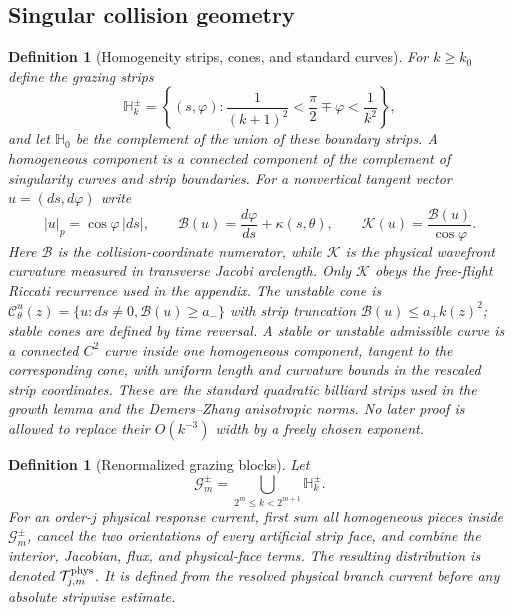 \documentclass[11pt]{amsart}
\theoremstyle{compactplain}
\theoremstyle{compactdefinition}
\newtheorem{definition}[theorem]{Definition}
\theoremstyle{compactremark}
\newcommand{\Hstrip}{\mathbb H}
\begin{document}
\subsection{Singular collision geometry}

\begin{definition}[Homogeneity strips, cones, and standard curves]
\label{def:strips_cones_standard_curves}
For $k\ge k_0$ define the grazing strips
\begin{equation}
  \Hstrip_k^\pm
  =\left\{(s,\varphi):
  \frac{1}{(k+1)^2}<
  \frac{\pi}{2}\mp\varphi<\frac{1}{k^2}\right\},
\end{equation}
and let $\Hstrip_0$ be the complement of the union of these boundary strips.
A homogeneous component is a connected component of the complement of
singularity curves and strip boundaries.  For a nonvertical tangent vector
$u=(ds,d\varphi)$ write
\begin{equation}
  |u|_p=\cos\varphi\,|ds|,
  \qquad
  \mathcal B(u)=\frac{d\varphi}{ds}+\kappa(s,\theta),
  \qquad
  \mathcal K(u)=\frac{\mathcal B(u)}{\cos\varphi}.
\end{equation}
Here \(\mathcal B\) is the collision-coordinate numerator, while
\(\mathcal K\) is the physical wavefront curvature measured in transverse
Jacobi arclength.  Only \(\mathcal K\) obeys the free-flight Riccati recurrence
used in the appendix.
The unstable cone is $\mathcal C^u_\theta(z)=\{u:ds\ne0,\mathcal B(u)\ge a_-\}$
with strip truncation
\(\mathcal B(u)\le a_+k(z)^2\); stable cones are defined by
time reversal.  A stable or unstable admissible curve is a connected $C^2$ curve
inside one homogeneous component, tangent to the corresponding cone, with
uniform length and curvature bounds in the rescaled strip coordinates.
These are the standard quadratic billiard strips used in the growth lemma and
the Demers--Zhang anisotropic norms.  No later proof is allowed to replace
their \(O(k^{-3})\) width by a freely chosen exponent.
\end{definition}

\begin{definition}[Renormalized grazing blocks]
\label{def:renormalized_grazing_blocks}
Let
\[
  \mathcal G_m^\pm
  =
  \bigcup_{2^m\le k<2^{m+1}}\Hstrip_k^\pm .
\]
For an order-\(j\) physical response current, first sum all homogeneous pieces
inside \(\mathcal G_m^\pm\), cancel the two orientations of every artificial
strip face, and combine the interior, Jacobian, flux, and physical-face terms.
The resulting distribution is denoted
\(\mathcal T_{j,m}^{\rm phys}\).  It is defined from the resolved physical
branch current before any absolute stripwise estimate.
\end{definition}
\end{document}
